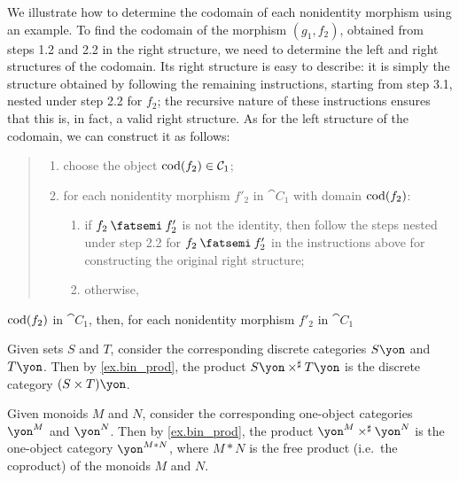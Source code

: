 \documentclass[Book-Poly]{subfiles}
\begin{document}
\begin{example}
We illustrate how to determine the codomain of each nonidentity morphism using an example.
To find the codomain of the morphism $(g_1, f_2)$, obtained from steps 1.2 and 2.2 in the right structure, we need to determine the left and right structures of the codomain.
Its right structure is easy to describe: it is simply the structure obtained by following the remaining instructions, starting from step 3.1, nested under step 2.2 for $f_2$; the recursive nature of these instructions ensures that this is, in fact, a valid right structure.
As for the left structure of the codomain, we can construct it as follows:
\begin{quote}
\begin{enumerate}[label=1.\arabic*.]
    \item choose the object $\operatorname{cod}(f_2) \in \mathcal{C}_1$;
    \item for each nonidentity morphism $f'_2$ in $\cat{C}_1$ with domain $\operatorname{cod}(f_2)$:
    \begin{enumerate}[label=2.\arabic*.]
        \item if $f_2 \then f'_2$ is not the identity, then follow the steps nested under step 2.2 for $f_2 \then f'_2$ in the instructions above for constructing the original right structure;
        \item otherwise, 
    \end{enumerate}
\end{enumerate}
\end{quote}

$\operatorname{cod}(f_2)$ in $\cat{C}_1$, then, for each nonidentity morphism $f'_2$ in $\cat{C}_1$ 





\end{example}

\begin{example}
Given sets $S$ and $T$, consider the corresponding discrete categories $S\yon$ and $T\yon$.
Then by \cref{ex.bin_prod}, the product $S\yon \times^\sharp T\yon$ is the discrete category $(S \times T)\yon$.
\end{example}

\begin{example}
Given monoids $M$ and $N$, consider the corresponding one-object categories $\yon^M$ and $\yon^N$.
Then by \cref{ex.bin_prod}, the product $\yon^M \times^\sharp \yon^N$ is the one-object category $\yon^{M \ast N}$, where $M \ast N$ is the free product (i.e.\ the coproduct) of the monoids $M$ and $N$.
\end{example}
\end{document}

